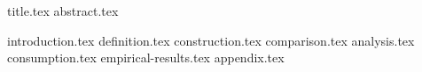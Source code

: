 \documentclass[11pt]{llncs}
\begin{document}
{title.tex}
\thispagestyle{plain}
{abstract.tex}

{introduction.tex}
{definition.tex}
{construction.tex}
{comparison.tex}
{analysis.tex}
{consumption.tex}
{empirical-results.tex}
\appendix
{appendix.tex}



\end{document}
